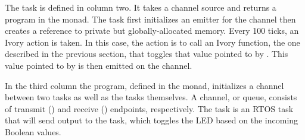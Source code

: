 The  task is defined in column two.  It takes a channel source and
returns a program in the  monad.  The task first
initializes an emitter for the channel then creates a reference to private but
globally-allocated memory.  Every 100 ticks, an Ivory action is taken.  In this
case, the action is to call an Ivory function, the one described in the
previous section, that toggles that value pointed to by .  This value
pointed to by  is then emitted on the channel.

In the third column the program, defined in the  monad, initializes a
channel between two tasks as well as the tasks themselves.  A channel, or queue,
consists of transmit () and receive () endpoints, respectively.
The  task is an RTOS task that will send output to the
 task, which toggles the LED based on the incoming Boolean
values.








